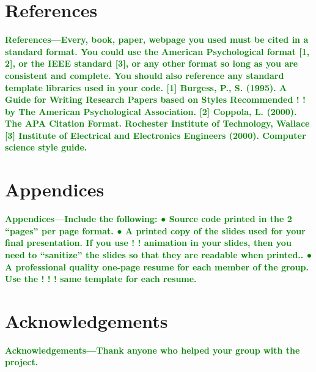 \documentclass{article}
\numberwithin{equation}{section} %
\begin{document}
\section{References}
\textcolor{green}{\bf References—Every, book, paper, webpage you used must be cited in a standard 
format. You could use the American Psychological format [1, 2], or the IEEE 
standard [3], or any other format so long as you are consistent and complete. You 
should also reference any standard template libraries used in your code. 
[1]  Burgess, P., S. (1995). A Guide for Writing Research Papers based on Styles Recommended 
! ! by The American Psychological Association. 
[2]  Coppola, L. (2000). The APA Citation Format. Rochester Institute of Technology, Wallace 
[3]  Institute of Electrical and Electronics Engineers (2000). Computer science style guide.  
}

\section{Appendices}
\textcolor{green}{\bf Appendices—Include the following:
● Source code printed in the 2 “pages” per page format.
● A printed copy of the slides used for your ﬁnal presentation. If you use 
! ! animation in your slides, then you need to “sanitize” the slides so that they are 
readable when printed..
● A professional quality one-page resume for each member of the group. Use the 
! ! ! same template for each resume.}

\section{Acknowledgements}
\textcolor{green}{\bf Acknowledgements—Thank anyone who helped your group with the project.}
\end{document}
